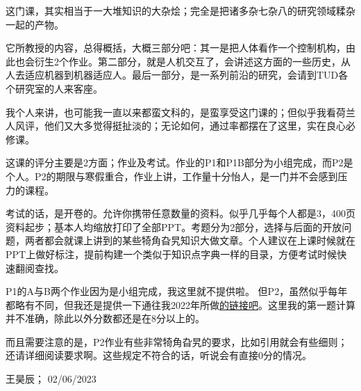 这门课，其实相当于一大堆知识的大杂烩；完全是把诸多杂七杂八的研究领域糅杂一起的产物。

它所教授的内容，总得概括，大概三部分吧：其一是把人体看作一个控制机构，由此也会衍生2个作业。第二部分，就是人机交互了，会讲述这方面的一些历史，从人去适应机器到机器适应人。最后一部分，是一系列前沿的研究，会请到TUD各个研究室的人来客座。

我个人来讲，也可能我一直以来都蛮文科的，是蛮享受这门课的；但似乎我看荷兰人风评，他们又大多觉得挺扯淡的；无论如何，通过率都摆在了这里，实在良心必修课。

这课的评分主要是2方面；作业及考试。作业的P1和P1B部分为小组完成，而P2是个人。P2的期限与寒假重合，作业上讲，工作量十分怡人，是一门并不会感到压力的课程。

考试的话，是开卷的。允许你携带任意数量的资料。似乎几乎每个人都是3，400页资料起步；基本人均缩放打印了全部PPT。考题分为2部分，选择与后面的开放问题，两者都会就课上讲到的某些犄角旮旯知识大做文章。个人建议在上课时候就在PPT上做好标注，提前构建一个类似于知识点字典一样的目录，方便考试时候快速翻阅查找。

P1的A与B两个作业因为是小组完成，我这里就不提供啦。 但P2，虽然似乎每年都略有不同，但我还是提供一下通往我2022年所做\href{https://drive.google.com/file/d/1GwwX7ZxEE8R7JeDm6NcHQu_IA34ZqyRe/view?usp=sharing}{\uline{的链接吧}}。这里我的第一题计算并不准确，除此以外分数都还是在8分以上的。

而且需要注意的是，P2作业有些非常犄角旮旯的要求，比如引用就会有些细则；还请详细阅读要求啊。这些规定不符合的话，听说会有直接0分的情况。
\begin{flushright}
王昊辰； 02/06/2023
\end{flushright}


